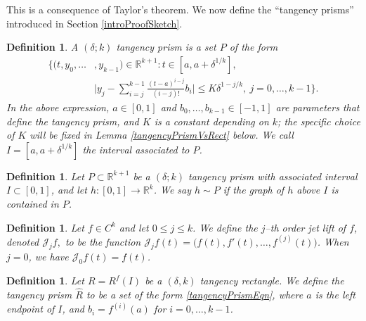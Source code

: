 \documentclass[letterpaper, reqno,11pt]{article}
\numberwithin{equation}{section}
\newcommand{\RR}{\mathbb{R}}
\numberwithin{thm}{section}
\newtheorem{defn}[thm]{Definition}
\theoremstyle{remark}
\begin{document}
\noindent This is a consequence of Taylor's theorem. We now define the ``tangency prisms'' introduced in Section \ref{introProofSketch}.

\begin{defn}\label{defnTangencyPrism}
A $(\delta;k)$ \emph{tangency prism} is a set $P$ of the form
\begin{equation}\label{tangencyPrismEqn}
\begin{split}
\Big\{(t, y_0,\ldots&,y_{k-1})\in\RR^{k+1}\colon  t\in [a, a+\delta^{1/k}],\\
&\Big| y_j - \sum_{i=j}^{k-1}\frac{(t-a)^{i-j}}{(i-j)!}b_i\Big|\leq K\delta^{1-j/k},\ j=0,\ldots,k-1\Big\}.
\end{split}
\end{equation}
In the above expression, $a\in[0,1]$ and $b_0,\ldots,b_{k-1}\in [-1,1]$ are parameters that define the tangency prism, and $K$ is a constant depending on $k$; the specific choice of $K$ will be fixed in Lemma \ref{tangencyPrismVsRect} below. We call $I = [a, a+\delta^{1/k}]$ the \emph{interval associated to} $P$.
\end{defn}


\begin{defn}
Let $P\subset\RR^{k+1}$ be a $(\delta;k)$ tangency prism with associated interval $I\subset[0,1]$, and let $h\colon [0,1]\to\RR^{k}$. We say $h\sim P$ if the graph of $h$ above $I$ is contained in $P$.
\end{defn}


\begin{defn}\label{jetLiftDefn}
Let $f\in C^k$ and let $0\leq j\leq k$. We define the $j$--th order jet lift of $f$, denoted $\mathcal{J}_jf,$ to be the function $\mathcal{J}_jf(t) = \big(f(t),f'(t),\ldots,f^{(j)}(t)\big)$. When $j=0$, we have $\mathcal{J}_0f(t)=f(t)$.
\end{defn}

\begin{defn}
Let $R=R^f(I)$ be a $(\delta,k)$ tangency rectangle. We define the tangency prism $\hat R$ to be a set of the form \eqref{tangencyPrismEqn}, where $a$ is the left endpoint of $I$, and $b_i = f^{(i)}(a)$ for $i=0,\ldots,k-1$.
\end{defn}
\end{document}
